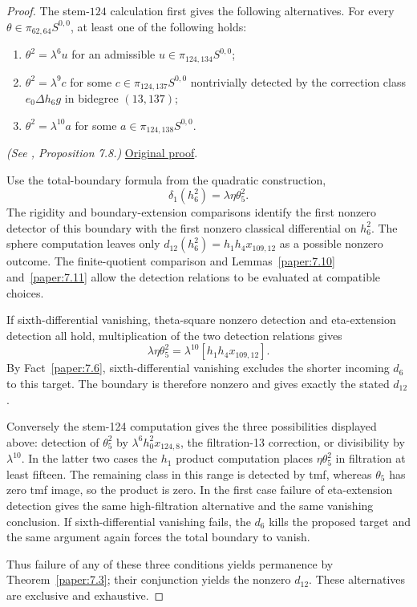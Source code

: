 \begin{proof}
The stem-$124$ calculation first gives the following alternatives.
For every $\theta\in\pi_{62,64}S^{0,0}$, at least one of the following holds:
\begin{enumerate}
\item $\theta^2=\lambda^6u$ for an admissible $u\in\pi_{124,134}S^{0,0}$;
\item $\theta^2=\lambda^9c$ for some $c\in\pi_{124,137}S^{0,0}$ nontrivially detected by the correction class $e_0\Delta h_6g$ in bidegree $(13,137)$;
\item $\theta^2=\lambda^{10}a$ for some $a\in\pi_{124,138}S^{0,0}$.
\end{enumerate}

\textit{(See \cite{LWX126}, Proposition 7.8.)} \href{paper/main.tex.html#L2300}{Original proof}.

Use the total-boundary formula from the quadratic construction,
\[
 \delta_1(h_6^2)=\lambda\eta\theta_5^2.
\]
The rigidity and boundary-extension comparisons identify the first nonzero detector of this boundary with the first nonzero classical differential on $h_6^2$. The sphere computation leaves only $d_{12}(h_6^2)=h_1h_4x_{109,12}$ as a possible nonzero outcome. The finite-quotient comparison and Lemmas~\ref{paper:7.10} and~\ref{paper:7.11} allow the detection relations to be evaluated at compatible choices.

If sixth-differential vanishing, theta-square nonzero detection and eta-extension detection all hold, multiplication of the two detection relations gives
\[
 \lambda\eta\theta_5^2=\lambda^{10}[h_1h_4x_{109,12}].
\]
By Fact~\ref{paper:7.6}, sixth-differential vanishing excludes the shorter incoming $d_6$ to this target. The boundary is therefore nonzero and gives exactly the stated $d_{12}$.

Conversely the stem-124 computation gives the three possibilities displayed above: detection of $\theta_5^2$ by $\lambda^6h_0^2x_{124,8}$, the filtration-13 correction, or divisibility by $\lambda^{10}$. In the latter two cases the $h_1$ product computation places $\eta\theta_5^2$ in filtration at least fifteen. The remaining class in this range is detected by tmf, whereas $\theta_5$ has zero tmf image, so the product is zero. In the first case failure of eta-extension detection gives the same high-filtration alternative and the same vanishing conclusion. If sixth-differential vanishing fails, the $d_6$ kills the proposed target and the same argument again forces the total boundary to vanish.

Thus failure of any of these three conditions yields permanence by Theorem~\ref{paper:7.3}; their conjunction yields the nonzero $d_{12}$. These alternatives are exclusive and exhaustive.
\end{proof}

